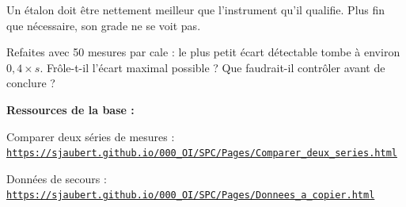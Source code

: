 \documentclass[10pt,a4paper]{article}
\begin{document}
\begin{tcolorbox}[retenir]Un étalon doit être nettement meilleur que l'instrument qu'il qualifie. Plus fin que nécessaire, son grade ne se voit pas.\end{tcolorbox}
\begin{tcolorbox}[plus]Refaites avec 50 mesures par cale : le plus petit écart détectable tombe à environ $0{,}4 \times s$. Frôle-t-il l'écart maximal possible ? Que faudrait-il contrôler avant de conclure ?\end{tcolorbox}
\vfill{\footnotesize\color{uimm}\textbf{Ressources de la base :}\par Comparer deux séries de mesures : \href{https://sjaubert.github.io/000_OI/SPC/Pages/Comparer_deux_series.html}{\nolinkurl{https://sjaubert.github.io/000_OI/SPC/Pages/Comparer_deux_series.html}}\par Données de secours : \href{https://sjaubert.github.io/000_OI/SPC/Pages/Donnees_a_copier.html\#grades}{\nolinkurl{https://sjaubert.github.io/000_OI/SPC/Pages/Donnees_a_copier.html}}}
\end{document}
